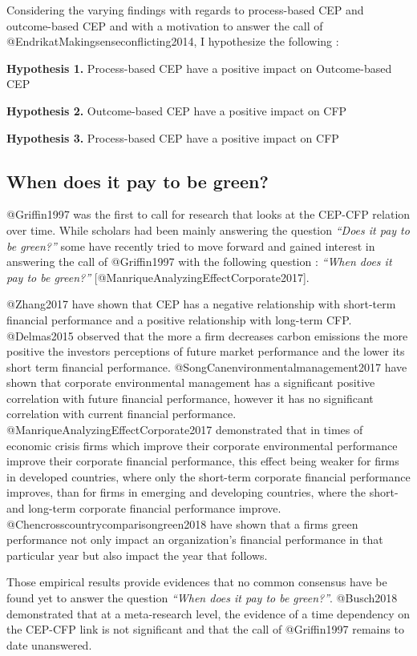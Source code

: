 \documentclass[]{article}
\begin{document}
Considering the varying findings with regards to process-based CEP and
outcome-based CEP and with a motivation to answer the call of
@EndrikatMakingsenseconflicting2014, I hypothesize the following :

\textbf{Hypothesis 1.} Process-based CEP have a positive impact on
Outcome-based CEP

\textbf{Hypothesis 2.} Outcome-based CEP have a positive impact on CFP

\textbf{Hypothesis 3.} Process-based CEP have a positive impact on CFP

\subsection{When does it pay to be
green?}\label{when-does-it-pay-to-be-green}

@Griffin1997 was the first to call for research that looks at the
CEP-CFP relation over time. While scholars had been mainly answering the
question \emph{``Does it pay to be green?''} some have recently tried to
move forward and gained interest in answering the call of @Griffin1997
with the following question : \emph{``When does it pay to be green?''}
{[}@ManriqueAnalyzingEffectCorporate2017{]}.

@Zhang2017 have shown that CEP has a negative relationship with
short-term financial performance and a positive relationship with
long-term CFP. @Delmas2015 observed that the more a firm decreases
carbon emissions the more positive the investors perceptions of future
market performance and the lower its short term financial performance.
@SongCanenvironmentalmanagement2017 have shown that corporate
environmental management has a significant positive correlation with
future financial performance, however it has no significant correlation
with current financial performance.
@ManriqueAnalyzingEffectCorporate2017 demonstrated that in times of
economic crisis firms which improve their corporate environmental
performance improve their corporate financial performance, this effect
being weaker for firms in developed countries, where only the short-term
corporate financial performance improves, than for firms in emerging and
developing countries, where the short- and long-term corporate financial
performance improve. @Chencrosscountrycomparisongreen2018 have shown
that a firms green performance not only impact an organization's
financial performance in that particular year but also impact the year
that follows.

Those empirical results provide evidences that no common consensus have
be found yet to answer the question \emph{``When does it pay to be
green?''}. @Busch2018 demonstrated that at a meta-research level, the
evidence of a time dependency on the CEP-CFP link is not significant and
that the call of @Griffin1997 remains to date unanswered.
\end{document}
